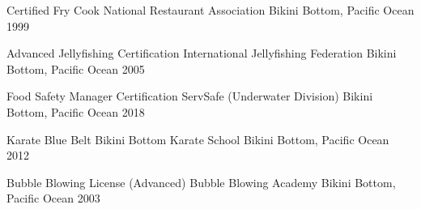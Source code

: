 \begin{cvhonors}
  \cvhonor
    {Certified Fry Cook} %
    {National Restaurant Association} %
    {Bikini Bottom, Pacific Ocean} %
    {1999} %

  \cvhonor
    {Advanced Jellyfishing Certification} %
    {International Jellyfishing Federation} %
    {Bikini Bottom, Pacific Ocean} %
    {2005} %

  \cvhonor
    {Food Safety Manager Certification} %
    {ServSafe (Underwater Division)} %
    {Bikini Bottom, Pacific Ocean} %
    {2018} %

  \cvhonor
    {Karate Blue Belt} %
    {Bikini Bottom Karate School} %
    {Bikini Bottom, Pacific Ocean} %
    {2012} %

  \cvhonor
    {Bubble Blowing License (Advanced)} %
    {Bubble Blowing Academy} %
    {Bikini Bottom, Pacific Ocean} %
    {2003} %
\end{cvhonors}
